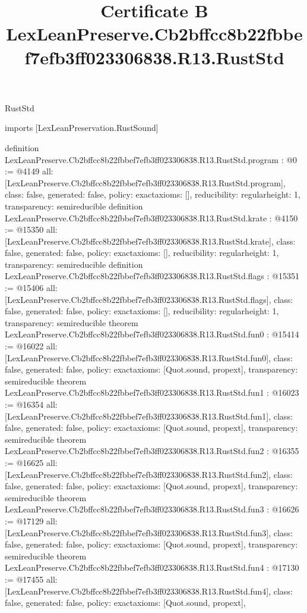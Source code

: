 \begin{lexlean}{RustStd}
\title{Certificate B LexLeanPreserve.Cb2bffcc8b22fbbef7efb3ff023306838.R13.RustStd}
\begin{coremodule}
imports [LexLeanPreservation.RustSound]

definition LexLeanPreserve.Cb2bffcc8b22fbbef7efb3ff023306838.R13.RustStd.program : @0 := @4149 {
  all: [LexLeanPreserve.Cb2bffcc8b22fbbef7efb3ff023306838.R13.RustStd.program],
  class: false,
  generated: false,
  policy: exact{axioms: []},
  reducibility: regular{height: 1},
  transparency: semireducible
}
definition LexLeanPreserve.Cb2bffcc8b22fbbef7efb3ff023306838.R13.RustStd.krate : @4150 := @15350 {
  all: [LexLeanPreserve.Cb2bffcc8b22fbbef7efb3ff023306838.R13.RustStd.krate],
  class: false,
  generated: false,
  policy: exact{axioms: []},
  reducibility: regular{height: 1},
  transparency: semireducible
}
definition LexLeanPreserve.Cb2bffcc8b22fbbef7efb3ff023306838.R13.RustStd.flags : @15351 := @15406 {
  all: [LexLeanPreserve.Cb2bffcc8b22fbbef7efb3ff023306838.R13.RustStd.flags],
  class: false,
  generated: false,
  policy: exact{axioms: []},
  reducibility: regular{height: 1},
  transparency: semireducible
}
theorem LexLeanPreserve.Cb2bffcc8b22fbbef7efb3ff023306838.R13.RustStd.fun0 : @15414 := @16022 {
  all: [LexLeanPreserve.Cb2bffcc8b22fbbef7efb3ff023306838.R13.RustStd.fun0],
  class: false,
  generated: false,
  policy: exact{axioms: [Quot.sound, propext]},
  transparency: semireducible
}
theorem LexLeanPreserve.Cb2bffcc8b22fbbef7efb3ff023306838.R13.RustStd.fun1 : @16023 := @16354 {
  all: [LexLeanPreserve.Cb2bffcc8b22fbbef7efb3ff023306838.R13.RustStd.fun1],
  class: false,
  generated: false,
  policy: exact{axioms: [Quot.sound, propext]},
  transparency: semireducible
}
theorem LexLeanPreserve.Cb2bffcc8b22fbbef7efb3ff023306838.R13.RustStd.fun2 : @16355 := @16625 {
  all: [LexLeanPreserve.Cb2bffcc8b22fbbef7efb3ff023306838.R13.RustStd.fun2],
  class: false,
  generated: false,
  policy: exact{axioms: [Quot.sound, propext]},
  transparency: semireducible
}
theorem LexLeanPreserve.Cb2bffcc8b22fbbef7efb3ff023306838.R13.RustStd.fun3 : @16626 := @17129 {
  all: [LexLeanPreserve.Cb2bffcc8b22fbbef7efb3ff023306838.R13.RustStd.fun3],
  class: false,
  generated: false,
  policy: exact{axioms: [Quot.sound, propext]},
  transparency: semireducible
}
theorem LexLeanPreserve.Cb2bffcc8b22fbbef7efb3ff023306838.R13.RustStd.fun4 : @17130 := @17455 {
  all: [LexLeanPreserve.Cb2bffcc8b22fbbef7efb3ff023306838.R13.RustStd.fun4],
  class: false,
  generated: false,
  policy: exact{axioms: [Quot.sound, propext]},
}
\end{coremodule}
\end{lexlean}
